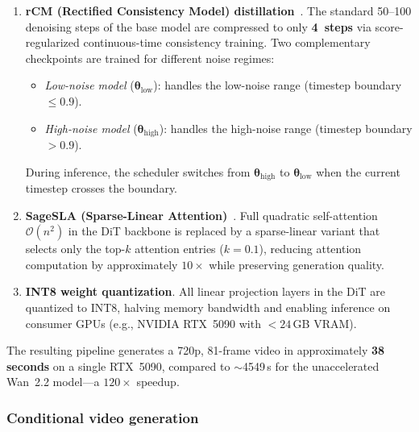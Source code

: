 \begin{enumerate}
    \item \textbf{rCM (Rectified Consistency Model)
          distillation}~\cite{rCM}.\;
          The standard 50--100 denoising steps of the base model are
          compressed to only \textbf{4~steps} via score-regularized
          continuous-time consistency training.  Two complementary
          checkpoints are trained for different noise regimes:
          \begin{itemize}
              \item \emph{Low-noise model} ($\bm{\theta}_{\text{low}}$):
                    handles the low-noise range
                    (timestep boundary $\leq 0.9$).
              \item \emph{High-noise model} ($\bm{\theta}_{\text{high}}$):
                    handles the high-noise range
                    (timestep boundary $> 0.9$).
          \end{itemize}
          During inference, the scheduler switches from
          $\bm{\theta}_{\text{high}}$ to $\bm{\theta}_{\text{low}}$
          when the current timestep crosses the boundary.

    \item \textbf{SageSLA (Sparse-Linear Attention)}~\cite{SLA}.\;
          Full quadratic self-attention $\mathcal{O}(n^{2})$ in the
          DiT backbone is replaced by a sparse-linear variant that
          selects only the top-$k$ attention entries ($k=0.1$),
          reducing attention computation by approximately $10\times$
          while preserving generation quality.

    \item \textbf{INT8 weight quantization}.\;
          All linear projection layers in the DiT are quantized to
          INT8, halving memory bandwidth and enabling inference on
          consumer GPUs (e.g., NVIDIA RTX~5090 with ${<}24$\,GB VRAM).
\end{enumerate}

The resulting pipeline generates a 720p, 81-frame video in
approximately \textbf{38 seconds} on a single RTX~5090, compared
to $\sim$4549\,s for the unaccelerated Wan~2.2 model---a
$120\times$ speedup.

\subsubsection{Conditional video generation}
\label{subsubsec:conditional_gen}

